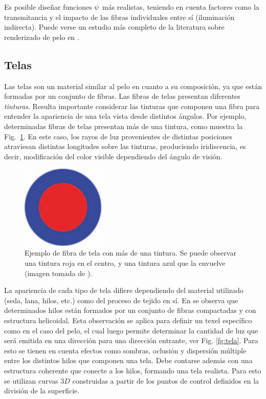 Es posible diseñar funciones $\bold{\psi}$ más realistas, teniendo en cuenta factores como la transmitancia y el impacto de las fibras individuales entre sí (iluminación indirecta).
Puede verse un estudio más completo de la literatura sobre renderizado de pelo en \cite{Ward2007}.

\subsection{Telas}
Las telas son un material similar al pelo en cuanto a su composición, ya que están formadas por un conjunto de fibras.
Las fibras de telas presentan diferentes {\em tinturas}.
Resulta importante considerar las tinturas que componen una fibra para entender la apariencia de una tela vista desde distintos ángulos.
Por ejemplo, determinadas fibras de telas presentan más de una tintura, como muestra la Fig.~\ref{fg:fibra}.
En este caso, los rayos de luz provenientes de distintas posiciones atraviesan distintas longitudes sobre las tinturas, produciendo iridiscencia, es decir, modificación del color visible dependiendo del ángulo de visión.

\begin{figure}
\center
\includegraphics[width=4cm]{figures/fibra}
\caption[Ejemplo de fibra de tela con más de una tintura]{Ejemplo de fibra de tela con más de una tintura. Se puede observar una tintura roja en el centro, y una tintura azul que la envuelve (imagen tomada de \cite{Xu2001}).}
\label{fg:fibra}
\end{figure}

La apariencia de cada tipo de tela difiere dependiendo del material utilizado (seda, lana, hilos, etc.) como del proceso de tejido en sí.
En \cite{Xu2001} se observa que determinados hilos están formados por un conjunto de fibras compactadas y con estructura helicoidal.
Esta observación se aplica para definir un texel específico como en el caso del pelo, el cual luego permite determinar la cantidad de luz que será emitida en una dirección para una dirección entrante, ver Fig. \ref{fg:tela}.
Para esto se tienen en cuenta efectos como sombras, oclusión y dispersión múltiple entre los distintos hilos que componen una tela.
Debe contarse además con una estructura coherente que conecte a los hilos, formando una tela realista.
Para esto se utilizan curvas $3D$ construidas a partir de los puntos de control definidos en la división de la superficie.


